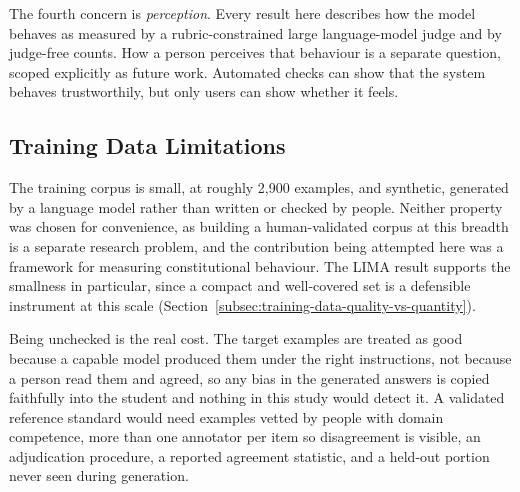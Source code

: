 The fourth concern is \emph{perception}. Every result here describes how the model behaves as measured by a rubric-constrained large language-model judge and by judge-free counts. How a person perceives that behaviour is a separate question, scoped explicitly as future work. Automated checks can show that the system behaves trustworthily, but only users can show whether it feels.

\subsection{Training Data Limitations}
\label{subsec:training-data-limitations}

The training corpus is small, at roughly 2,900 examples, and synthetic, generated by a language model rather than written or checked by people. Neither property was chosen for convenience, as building a human-validated corpus at this breadth is a separate research problem, and the contribution being attempted here was a framework for measuring constitutional behaviour. The LIMA result supports the smallness in particular, since a compact and well-covered set is a defensible instrument at this scale (Section~\ref{subsec:training-data-quality-vs-quantity}).

Being unchecked is the real cost. The target examples are treated as good because a capable model produced them under the right instructions, not because a person read them and agreed, so any bias in the generated answers is copied faithfully into the student and nothing in this study would detect it. A validated reference standard would need examples vetted by people with domain competence, more than one annotator per item so disagreement is visible, an adjudication procedure, a reported agreement statistic, and a held-out portion never seen during generation.
